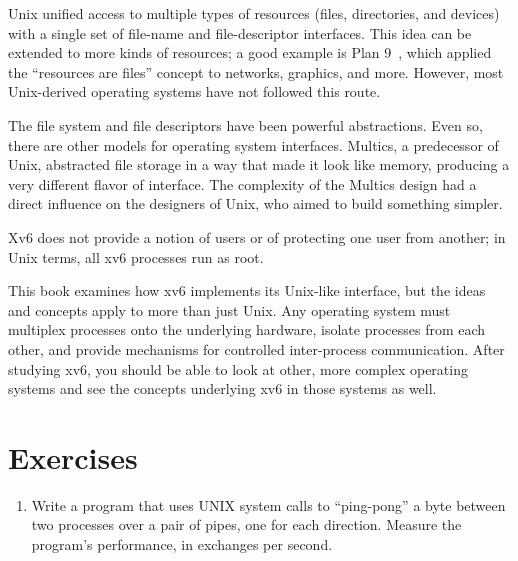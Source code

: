Unix unified access to multiple types of resources (files,
directories, and devices) with a single set of
file-name and file-descriptor interfaces.
This idea can be extended to more kinds of resources;
a good example is Plan 9~\cite{Presotto91plan9},
which applied the ``resources are files''
concept to
networks, graphics, and more.
However, most Unix-derived operating systems have
not followed this route.

The file system and file descriptors have been  powerful
abstractions.
Even so, there are other models for operating system interfaces.
Multics, a predecessor of Unix,
abstracted file storage in a way that made it look like memory,
producing a very different flavor of interface.
The complexity of the Multics design had a direct influence
on the designers of Unix, who aimed to build something simpler.

Xv6 does not provide a notion of users or of protecting
one user from another; in Unix terms, all xv6 processes
run as root.

This book examines how xv6 implements its Unix-like interface,
but the ideas and concepts apply to more than just Unix.
Any operating system must multiplex processes onto
the underlying hardware, isolate processes from each
other, and provide mechanisms for controlled
inter-process communication.
After studying xv6, you should be able to
look at other, more complex operating systems
and see the concepts underlying xv6 in those systems as well.

\section{Exercises}

\begin{enumerate}

\item Write a program that uses UNIX system calls to
``ping-pong'' a byte between two processes over a pair
of pipes, one for each direction. Measure the
program's performance, in exchanges per second.

\end{enumerate}

\fi